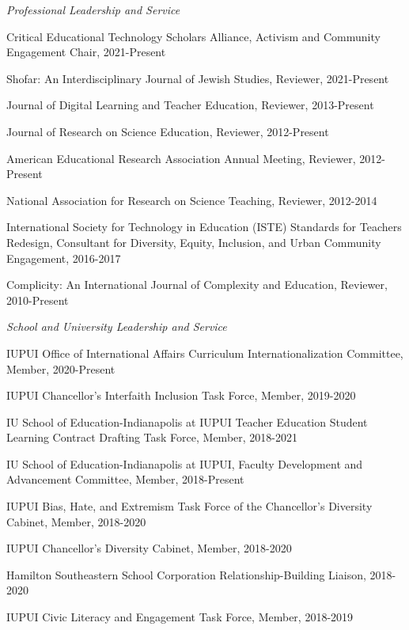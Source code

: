 \documentclass[11pt,article,oneside]{memoir}
\begin{document}
\medskip

\noindent\emph{Professional Leadership and Service \vspace{0.01in}}

\ind Critical Educational Technology Scholars Alliance, Activism and Community Engagement Chair, 2021-Present

\ind Shofar: An Interdisciplinary Journal of Jewish Studies, Reviewer, 2021-Present

\ind Journal of Digital Learning and Teacher Education, Reviewer, 2013-Present

\ind Journal of Research on Science Education, Reviewer, 2012-Present

\ind American Educational Research Association Annual Meeting, Reviewer, 2012-Present

\ind National Association for Research on Science Teaching, Reviewer, 2012-2014

\ind International Society for Technology in Education (ISTE) Standards for Teachers Redesign, Consultant for 
Diversity, Equity, Inclusion, and Urban Community Engagement, 2016-2017

\ind Complicity: An International Journal of Complexity and Education, Reviewer, 2010-Present


\medskip

\noindent\emph{School and University Leadership and Service \vspace{0.01in}}

\ind IUPUI Office of International Affairs Curriculum Internationalization Committee, Member, 2020-Present

\ind IUPUI Chancellor’s Interfaith Inclusion Task Force, Member, 2019-2020

\ind IU School of Education-Indianapolis at IUPUI Teacher Education Student Learning Contract Drafting Task Force, Member, 2018-2021

\ind IU School of Education-Indianapolis at IUPUI, Faculty Development and Advancement Committee, Member, 2018-Present

\ind IUPUI Bias, Hate, and Extremism Task Force of the Chancellor’s Diversity Cabinet, Member, 2018-2020

\ind IUPUI Chancellor’s Diversity Cabinet, Member, 2018-2020

\ind Hamilton Southeastern School Corporation Relationship-Building	Liaison, 2018-2020

\ind IUPUI Civic Literacy and Engagement Task Force, Member, 2018-2019
\end{document}
